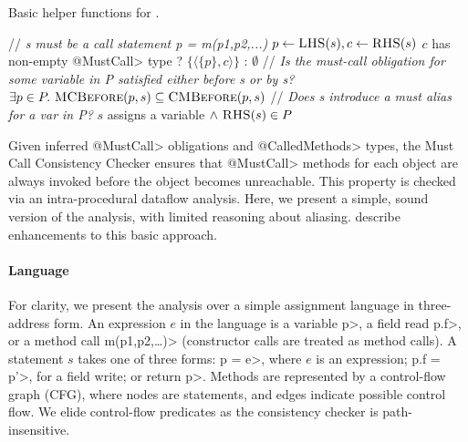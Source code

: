 \begin{algorithm}[h]
  \caption{Basic helper functions for . 
}
  \label{alg:helpers}
  \begin{algorithmic}[1]
  \State // \textit{s must be a call statement p = m(p1,p2,...)}
  \State $p \gets \textsc{LHS}(s), c \gets \textsc{RHS}(s)$
  \State \Return $c$ has non-empty \<@MustCall> type ? $\{ \langle \{ p \}, c
  \rangle \}$ : $\emptyset$
  \EndProcedure
  \State // \textit{Is the must-call obligation for some variable in P satisfied either before s or by s?}
  \State \Return $\exists p \in P .\ \textsc{MCBefore}(p,s) \subseteq \textsc{CMBefore}(p,s)$
  \EndProcedure
  \State // \textit{Does s introduce a must alias for a var in P?}
    \State \Return $s$ assigns a variable $\wedge\ \textsc{RHS}(s) \in P$
  \EndProcedure
  \end{algorithmic}

\end{algorithm}


Given inferred \<@MustCall> obligations and \<@CalledMethods> types, the Must
Call Consistency Checker ensures that \<@MustCall> methods for each object
are always invoked before the object becomes unreachable.  This property is
checked via an intra-procedural dataflow analysis.  Here, we present
a simple, sound version of the analysis, with limited reasoning about aliasing.
describe enhancements to this basic approach.

\paragraph{Language} For clarity, we present the analysis over a simple
assignment language in three-address form.  An expression $e$ in the language is
a variable \<p>, a field read \<p.f>, or a method call \<m(p1,p2,\ldots)> (constructor
calls are treated as method calls).  A statement $s$ takes one of three forms:
\<p = e>, where $e$ is an expression; \<p.f = p'>, for a field write; or
\<return p>.  Methods are represented by a control-flow graph (CFG), where nodes
are statements, and edges indicate possible control flow.  We elide control-flow
predicates as the consistency checker is path-insensitive. 

